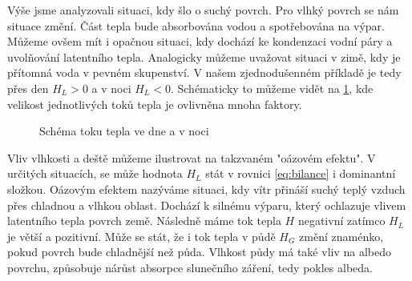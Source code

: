 Výše jsme analyzovali situaci, kdy šlo o suchý povrch. Pro vlhký povrch se nám situace změní. Část tepla bude absorbována vodou a spotřebována na výpar. Můžeme ovšem mít i opačnou situaci, kdy dochází ke kondenzaci vodní páry a uvolňování latentního tepla. Analogicky můžeme uvažovat situaci v zimě, kdy je přítomná voda v pevném skupenství. V našem zjednodušenném příkladě je tedy přes den $H_L > 0$ a v noci $H_L < 0$. Schématicky to můžeme vidět na \ref{fig:schema}, kde velikost jednotlivých toků tepla je ovlivněna mnoha faktory\cite{arya2001}.

\begin{figure}
\centering
\caption{Schéma toku tepla ve dne a v noci}
\label{fig:schema}
\end{figure}

Vliv vlhkosti a deště můžeme ilustrovat na takzvaném "oázovém efektu". V určitých situacích, se může hodnota $H_L$ stát v rovnici \eqref{eq:bilance} i dominantní složkou. Oázovým efektem nazýváme situaci, kdy vítr přináší suchý teplý vzduch přes chladnou a vlhkou oblast. Dochází k silnému výparu, který ochlazuje vlivem latentního tepla povrch země. Následně máme tok tepla $H$ negativní zatímco $H_L$ je větší a pozitivní. Může se stát, že i tok tepla v půdě $H_G$ změní znaménko, pokud povrch bude chladnější než půda. Vlhkost půdy má také vliv na albedo povrchu, způsobuje nárůst absorpce slunečního záření, tedy pokles albeda\cite{arya2001}.


